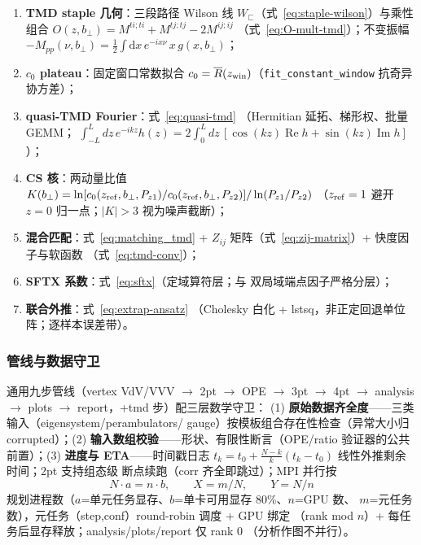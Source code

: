 \documentclass[11pt,a4paper]{ctexart}
\newcommand{\code}[1]{\texttt{#1}}
\newcommand{\bperp}{b_{\perp}}
\begin{document}
\begin{enumerate}
  \item \textbf{TMD staple 几何}：三段路径 Wilson 线
  $W_\sqsubset$（式~\eqref{eq:staple-wilson}）与乘性组合
  $O(z,\bperp)=M^{ti;ti}+M^{tj;tj}-2M^{ij;ij}$
  （式~\eqref{eq:O-mult-tmd}）；不变振幅
  $-M_{pp}(\nu,\bperp)=\frac12\int\mathrm{d}x\,e^{-ix\nu}\,
  x\,g(x,\bperp)$；
  \item \textbf{$c_0$ plateau}：固定窗口常数拟合
  $c_0=\overline{R}(z_{\rm win})$（\code{fit\_constant\_window}
  抗奇异协方差）；
  \item \textbf{quasi-TMD Fourier}：式~\eqref{eq:quasi-tmd}
  （Hermitian 延拓、梯形权、批量 GEMM；
  $\int_{-L}^{L}dz\,e^{-ikz}h(z)
  =2\int_0^L dz\,[\cos(kz)\operatorname{Re}h
  +\sin(kz)\operatorname{Im}h]$）；
  \item \textbf{CS 核}：两动量比值
  $K(\bperp)=\ln[c_0(z_{\rm ref},\bperp,P_{z1})/
  c_0(z_{\rm ref},\bperp,P_{z2})]/\ln(P_{z1}/P_{z2})$
  （$z_{\rm ref}=1$ 避开 $z=0$ 归一点；$|K|>3$ 视为噪声截断）；
  \item \textbf{混合匹配}：式~\eqref{eq:matching_tmd} +
  $Z_{ij}$ 矩阵（式~\eqref{eq:zij-matrix}）+ 快度因子与软函数
  （式~\eqref{eq:tmd-conv}）；
  \item \textbf{SFTX 系数}：式~\eqref{eq:sftx}（定域算符层；与
  双局域端点因子严格分层）；
  \item \textbf{联合外推}：式~\eqref{eq:extrap-ansatz}
  （Cholesky 白化 + lstsq，非正定回退单位阵；逐样本误差带）。
\end{enumerate}

\subsubsection{管线与数据守卫}

通用九步管线（vertex VdV/VVV $\to$ 2pt $\to$ OPE $\to$ 3pt $\to$ 4pt
$\to$ analysis $\to$ plots $\to$ report，+tmd 步）配三层数学守卫：
(1) \textbf{原始数据齐全度}——三类输入（eigensystem/perambulators/
gauge）按模板组合存在性检查（异常大小归 corrupted）；(2)
\textbf{输入数组校验}——形状、有限性断言（OPE/ratio 验证器的公共
前置）；(3) \textbf{进度与 ETA}——时间戳日志
$t_k=t_0+\frac{N-k}{k}(t_k-t_0)$ 线性外推剩余时间；2pt 支持组态级
断点续跑（corr 齐全即跳过）；MPI 并行按
\begin{equation}
N\cdot a = n\cdot b,\qquad X=m/N,\qquad Y=N/n
\end{equation}
规划进程数（$a$=单元任务显存、$b$=单卡可用显存 80\%、$n$=GPU 数、
$m$=元任务数），元任务（step,conf）round-robin 调度 + GPU 绑定
（rank mod $n$）+ 每任务后显存释放；analysis/plots/report 仅 rank 0
（分析作图不并行）。
\end{document}
